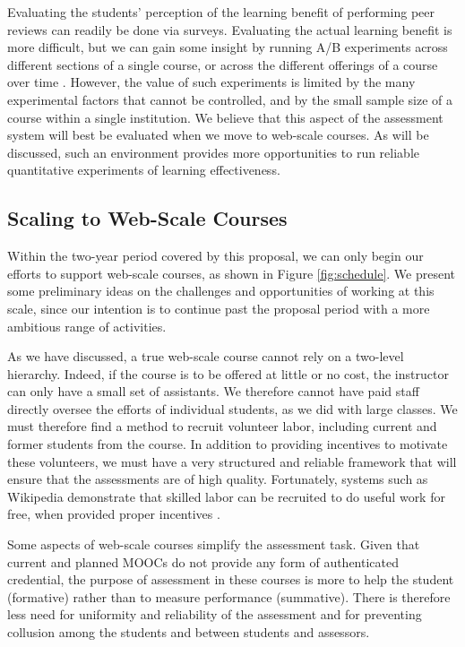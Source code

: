 \documentclass[12pt]{article}
\begin{document}
Evaluating the students' perception of the learning benefit of
performing peer reviews can readily be done via surveys.  Evaluating
the actual learning benefit is more difficult, but we can gain some
insight by running A/B experiments across different sections of a
single course, or across the different offerings of a course over time
\citep{kohavi-dmkd09}.  However, the value of such experiments is
limited by the many experimental factors that cannot be controlled,
and by the small sample size of a course within a single institution.
We believe that this aspect of the assessment system will best be
evaluated when we move to web-scale courses.  As will be discussed,
such an environment provides more opportunities to run reliable
quantitative experiments of learning effectiveness.

\subsection{Scaling to Web-Scale Courses}

Within the two-year period covered by this proposal, we can only
begin our efforts to support web-scale courses, as shown in Figure
\ref{fig:schedule}.  We present some preliminary ideas on the
challenges and opportunities of working at this scale, since our
intention is to continue past the proposal period with a more
ambitious range of activities.

As we have discussed, a true web-scale course cannot rely on a
two-level hierarchy.  Indeed, if the course is to be offered at little
or no cost, the instructor can only have a small set of assistants.
We therefore cannot have paid staff directly oversee the efforts of
individual students, as we did with large classes.  We must therefore
find a method to recruit volunteer labor, including current and former
students from the course.  In addition to providing incentives to
motivate these volunteers, we must have a very structured and reliable
framework that will ensure that the assessments are of high quality.
Fortunately, systems such as Wikipedia demonstrate that skilled labor
can be recruited to do useful work for free, when provided proper incentives
\citep{nov-cacm07}.

Some aspects of web-scale courses simplify the assessment task.
Given that current and planned MOOCs do not provide
any form of authenticated credential, the purpose of assessment in
these courses is more to help the student (formative) rather than to
measure performance (summative).  There is therefore less need for
uniformity and reliability of the assessment and for preventing
collusion among the students and between students and assessors.
\end{document}
